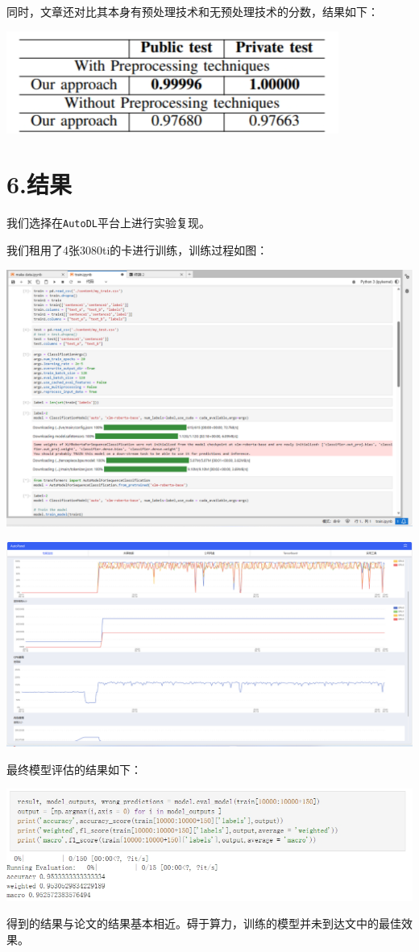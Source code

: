 \documentclass[
]{article}
\begin{document}
同时，文章还对比其本身有预处理技术和无预处理技术的分数，结果如下：

\includegraphics{./pic/2.png}

\section{6.结果}\label{6ux7ed3ux679c}

我们选择在\texttt{AutoDL}平台上进行实验复现。

我们租用了4张3080ti的卡进行训练，训练过程如图：

\includegraphics{./pic/3.png}

\includegraphics{./pic/4.png}

最终模型评估的结果如下：

\includegraphics{./pic/5.png}

得到的结果与论文的结果基本相近。碍于算力，训练的模型并未到达文中的最佳效果。
\end{document}
